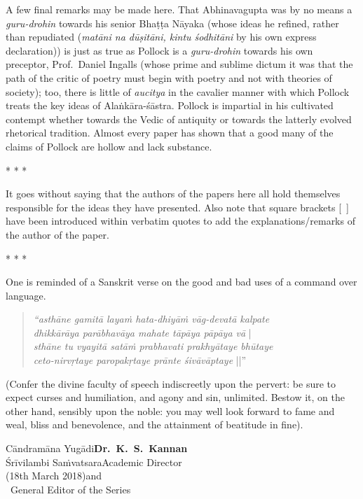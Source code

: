 A few final remarks may be made here. That Abhinavagupta was by no means a \textsl{guru-drohin} towards his senior Bhaṭṭa Nāyaka (whose ideas he refined, rather than repudiated (\textsl{matāni na dūṣitāni, kintu śodhitāni} by his own express declaration)) is just as true as Pollock is a \textsl{guru-drohin} towards his own preceptor, Prof.\ Daniel Ingalls (whose prime and sublime dictum it was that the path of the critic of poetry must begin with poetry and not with theories of society); too, there is little of \textsl{aucitya} in the cavalier manner with which Pollock treats the key ideas of Alaṅkāra-śāstra. Pollock is impartial in his cultivated contempt whether towards the Vedic of antiquity or towards the latterly evolved rhetorical tradition. Almost every paper has shown that a good many of the claims of Pollock are hollow and lack substance.
\begin{center}
* * *
\end{center}
It goes without saying that the authors of the papers here all hold themselves responsible for the ideas they have presented. Also note that square brackets [~] have been introduced within verbatim quotes to add the explanations/remarks of the author of the paper.
\begin{center}
* * *
\end{center}
One is reminded of a Sanskrit verse on the good and bad uses of a command over language.
\begin{quote}
\textsl{“asthāne gamitā layaṁ hata-dhiyāṁ vāg-devatā kalpate}\\[2pt]
\phantom{aaaaaa}\textsl{dhikkārāya parābhavāya mahate tāpāya pāpāya vā} |\\[2pt]
\textsl{sthāne tu vyayitā satāṁ prabhavati prakhyātaye bhūtaye}\\[2pt]
\phantom{aaaaaa}\textsl{ceto-nirvṛtaye paropakṛtaye prānte śivāvāptaye} ||”
\end{quote}

\begin{normalmyquote}
(Confer the divine faculty of speech indiscreetly upon the pervert: be sure to expect curses and humiliation, and agony and sin, unlimited. Bestow it, on the other hand, sensibly upon the noble: you may well look forward to fame and weal, bliss and benevolence, and the attainment of beatitude in fine).
\end{normalmyquote}

\bigskip
\noindent
Cāndramāna Yugādi\hfill {\bf Dr.\ K.\ S.\ Kannan}\\
Śrīvilambi Saṁvatsara\hfill Academic Director\\
(18th March 2018)\hfill	and\\
~\phantom{a}\hfill  General Editor of the Series

